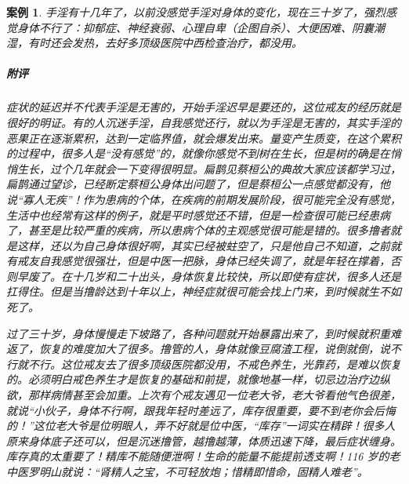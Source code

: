 \documentclass{ctexart}
\newtheorem{case}{案例}
\begin{document}
\begin{case}
    手淫有十几年了，以前没感觉手淫对身体的变化，现在三十岁了，强烈感觉身体不行了：抑郁症、神经衰弱、心理自卑（企图自杀）、大便困难、阴囊潮湿，有时还会发热，去好多顶级医院中西检查治疗，都没用。
    \subparagraph{附评} 症状的延迟并不代表手淫是无害的，开始手淫迟早是要还的，这位戒友的经历就是很好的明证。有的人沉迷手淫，自我感觉还行，就以为手淫是无害的，其实手淫的恶果正在逐渐累积，达到一定临界值，就会爆发出来。量变产生质变，在这个累积的过程中，很多人是“没有感觉”的，就像你感觉不到树在生长，但是树的确是在悄悄生长，过个几年就会一下变得很明显。扁鹊见蔡桓公的典故大家应该都学习过，扁鹊通过望诊，已经断定蔡桓公身体出问题了，但是蔡桓公一点感觉都没有，他说“寡人无疾”！作为患病的个体，在疾病的前期发展阶段，很可能完全没有感觉，生活中也经常有这样的例子，就是平时感觉还不错，但是一检查很可能已经患病了，甚至是比较严重的疾病，所以患病个体的主观感觉很可能是错的。很多撸者就是这样，还以为自己身体很好啊，其实已经被蛀空了，只是他自己不知道，之前就有戒友自我感觉很强壮，但是中医一把脉，身体已经失调了，就是年轻在撑着，否则早废了。在十几岁和二十出头，身体恢复比较快，所以即使有症状，很多人还是扛得住。但是当撸龄达到十年以上，神经症就很可能会找上门来，到时候就生不如死了。

    过了三十岁，身体慢慢走下坡路了，各种问题就开始暴露出来了，到时候就积重难返了，恢复的难度加大了很多。撸管的人，身体就像豆腐渣工程，说倒就倒，说不行就不行。这位戒友去了很多顶级医院都没用，不戒色养生，光靠药，是难以恢复的。必须明白戒色养生才是恢复的基础和前提，就像地基一样，切忌边治疗边纵欲，那样病情甚至会加重。上次有个戒友遇见一位老大爷，老大爷看他气色很差，就说“小伙子，身体不行啊，跟我年轻时差远了，库存很重要，要不到老你会后悔的！”这位老大爷是位明眼人，弄不好就是位中医，“库存”一词实在精辟！很多人原来身体底子还可以，但是沉迷撸管，越撸越薄，体质迅速下降，最后症状缠身。库存真的太重要了！精库不能随便泄啊！生命的能量不能提前透支啊！116 岁的老中医罗明山就说：“肾精人之宝，不可轻放炮；惜精即惜命，固精人难老”。
\end{case}
\end{document}
